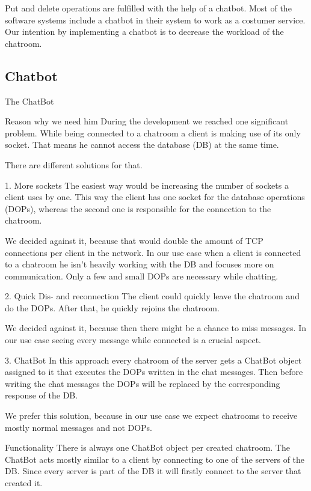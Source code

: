 Put and delete operations are fulfilled with the help of a chatbot. Most of the software systems include a chatbot in their system to work as a costumer service. Our intention by implementing a chatbot is to decrease the workload of the chatroom.

\subsection{Chatbot}
\label{sec:groupchat_chatbot}
The ChatBot

Reason why we need him
During the development we reached one significant problem. While being connected to a chatroom a client is making use of its only socket. That means he cannot access the database (DB) at the same time.

There are different solutions for that.

1.	More sockets 
The easiest way would be increasing the number of sockets a client uses by one. This way the client has one socket for the database operations (DOPs), whereas the second one is responsible for the connection to the chatroom.

We decided against it, because that would double the amount of TCP connections per client in the network. In our use case when a client is connected to a chatroom he isn’t heavily working with the DB and focuses more on communication. Only a few and small DOPs are necessary while chatting.

2.	Quick Dis- and reconnection
The client could quickly leave the chatroom and do the DOPs. After that, he quickly rejoins the chatroom.

We decided against it, because then there might be a chance to miss messages. In our use case seeing every message while connected is a crucial aspect.

3.	ChatBot
In this approach every chatroom of the server gets a ChatBot object assigned to it that executes the DOPs written in the chat messages. Then before writing the chat messages the DOPs will be replaced by the corresponding response of the DB. 

We prefer this solution, because in our use case we expect chatrooms to receive mostly normal messages and not DOPs. 

Functionality
There is always one ChatBot object per created chatroom. The ChatBot acts mostly similar to a client by connecting to one of the servers of the DB. Since every server is part of the DB it will firstly connect to the server that created it. 

